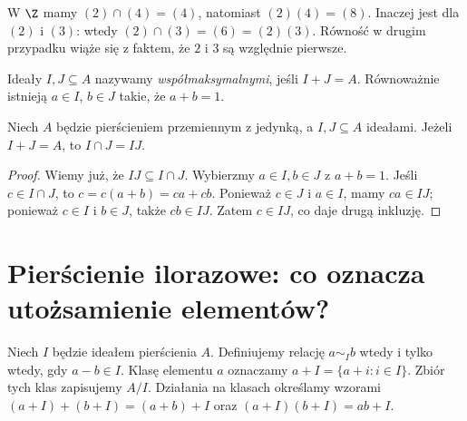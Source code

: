 \begin{przyklad}
W $\Z$ mamy $(2)\cap(4)=(4)$, natomiast $(2)(4)=(8)$.
Inaczej jest dla $(2)$ i $(3)$: wtedy
$(2)\cap(3)=(6)=(2)(3)$. Równość w drugim przypadku wiąże się
z faktem, że $2$ i $3$ są względnie pierwsze.
\end{przyklad}

\begin{definicja}
Ideały $I,J\subseteq A$ nazywamy \emph{współmaksymalnymi}, jeśli
$I+J=A$. Równoważnie istnieją $a\in I$, $b\in J$ takie, że $a+b=1$.
\end{definicja}

\begin{stwierdzenie}
Niech $A$ będzie pierścieniem przemiennym z jedynką, a $I,J\subseteq A$ ideałami.
Jeżeli $I+J=A$, to $I\cap J=IJ$.
\end{stwierdzenie}
\begin{proof}
Wiemy już, że $IJ\subseteq I\cap J$.
Wybierzmy $a\in I,b\in J$ z $a+b=1$. Jeśli $c\in I\cap J$,
to $c=c(a+b)=ca+cb$. Ponieważ $c\in J$ i $a\in I$,
mamy $ca\in IJ$; ponieważ $c\in I$ i $b\in J$,
także $cb\in IJ$. Zatem $c\in IJ$, co daje drugą inkluzję.
\end{proof}

\section{Pierścienie ilorazowe: co oznacza utożsamienie elementów?}

\begin{definicja}
Niech $I$ będzie ideałem pierścienia $A$. Definiujemy relację
$a\sim_Ib$ wtedy i tylko wtedy, gdy $a-b\in I$.
Klasę elementu $a$ oznaczamy $a+I=\{a+i:i\in I\}$.
Zbiór tych klas zapisujemy $A/I$.
Działania na klasach określamy wzorami
$(a+I)+(b+I)=(a+b)+I$ oraz $(a+I)(b+I)=ab+I$.
\end{definicja}

